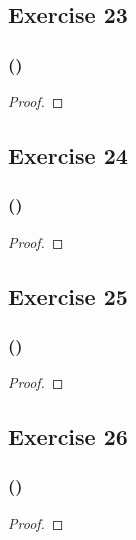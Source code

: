 \documentclass[14pt]{extarticle}
\begin{document}
\subsection{Exercise 23}

\subsubsection{()}

\begin{proof}

\end{proof}

\subsection{Exercise 24}

\subsubsection{()}

\begin{proof}

\end{proof}

\subsection{Exercise 25}

\subsubsection{()}

\begin{proof}

\end{proof}

\subsection{Exercise 26}

\subsubsection{()}

\begin{proof}

\end{proof}
\end{document}

